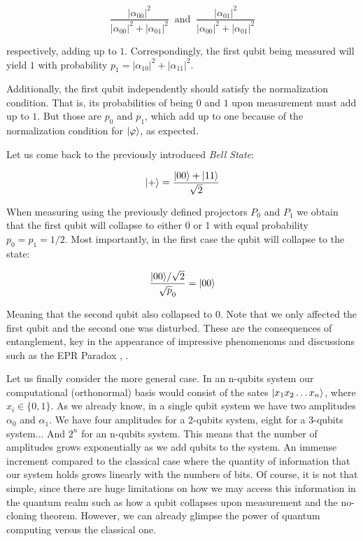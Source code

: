 $$ \frac{ |\alpha_{00}|^2 }{ |\alpha_{00}|^2 + |\alpha_{01}|^2 }  \ \text{ and } \ 
\frac{ |\alpha_{01}|^2 }{ |\alpha_{00}|^2 + |\alpha_{01}|^2 } $$

respectively, adding up to $1$. Correspondingly, the first qubit being measured will yield $1$ with probability $p_1 = |\alpha_{10}|^2 + |\alpha_{11}|^2$.

Additionally, the first qubit independently should satisfy the normalization condition. That is, its probabilities of being $0$ and $1$ upon measurement must add up to $1$. But those are $p_0$ and $p_1$, which add up to one because of the normalization condition for $|\varphi\rangle$, as expected.

Let us come back to the previously introduced \emph{Bell State}:

$$ |+\rangle = \frac{ |00\rangle + |11\rangle }{ \sqrt 2 } $$

When measuring using the previously defined projectors $P_0$ and $P_1$ we obtain that the first qubit will collapse to either 0 or 1 with equal probability $p_0 = p_1 = 1/2$. Most importantly, in the first case the qubit will collapse to the state:

$$ \frac{ |00\rangle / \sqrt 2 }{ \sqrt p_0 } = |00\rangle $$

Meaning that the second qubit also collapsed to 0. Note that we only affected the first qubit and the second one was disturbed. These are the consequences of entanglement, key in the appearance of impressive phenomenoms and discussions such as the EPR Paradox \cite{Einstein1935}, \cite{Bellt1964}.

Let us finally consider the more general case. In an n-qubits system our computational (orthonormal) basis would consist of the sates $|x_1 x_2 \dotsc x_n\rangle$, where $x_i \in \{0,1\}$. As we already know, in a single qubit system we have two amplitudes $\alpha_0$ and $\alpha_1$. We have four amplitudes for a 2-qubits system, eight for a 3-qubits system... And $2^n$ for an n-qubits system. This means that the number of amplitudes grows exponentially as we add qubits to the system. An immense increment compared to the classical case where the quantity of information that our system holds grows linearly with the numbers of bits. Of course, it is not that simple, since there are huge limitations on how we may access this information in the quantum realm such as how a qubit collapses upon measurement and the no-cloning theorem. However, we can already glimpse the power of quantum computing versus the classical one.


